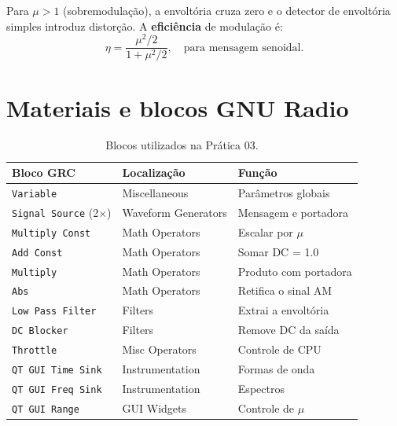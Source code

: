 \documentclass[11pt,a4paper]{article}
\begin{document}
Para $\mu > 1$ (sobremodulação), a envoltória cruza zero e o detector de
envoltória simples introduz distorção. A \textbf{eficiência} de modulação é:
\begin{equation}
  \eta = \frac{\mu^2/2}{1 + \mu^2/2},
  \quad\text{para mensagem senoidal.}
\end{equation}

\section{Materiais e blocos GNU Radio}

\begin{table}[H]
  \centering
  \begin{tabular}{l l l}
    \toprule
    \textbf{Bloco GRC} & \textbf{Localização} & \textbf{Função} \\
    \midrule
    \texttt{Variable}           & Miscellaneous        & Parâmetros globais \\
    \texttt{Signal Source} (2×) & Waveform Generators  & Mensagem e portadora \\
    \texttt{Multiply Const}     & Math Operators       & Escalar por $\mu$ \\
    \texttt{Add Const}          & Math Operators       & Somar DC = 1.0 \\
    \texttt{Multiply}           & Math Operators       & Produto com portadora \\
    \texttt{Abs}                & Math Operators       & Retifica o sinal AM \\
    \texttt{Low Pass Filter}    & Filters              & Extrai a envoltória \\
    \texttt{DC Blocker}         & Filters              & Remove DC da saída \\
    \texttt{Throttle}           & Misc Operators       & Controle de CPU \\
    \texttt{QT GUI Time Sink}   & Instrumentation      & Formas de onda \\
    \texttt{QT GUI Freq Sink}   & Instrumentation      & Espectros \\
    \texttt{QT GUI Range}       & GUI Widgets          & Controle de $\mu$ \\
    \bottomrule
  \end{tabular}
  \caption{Blocos utilizados na Prática 03.}
\end{table}

\end{document}
